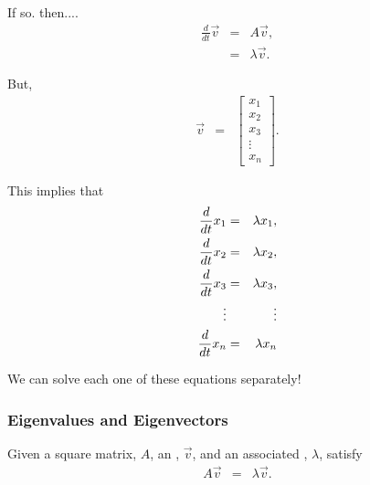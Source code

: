 \begin{frame}
  If so. then....
  \begin{eqnarray*}
    \frac{d}{dt} \vec{v} & = & A \vec{v}, \\
    & = & \lambda \vec{v}.
  \end{eqnarray*}

  {
    But,
    \begin{eqnarray*}
      \vec{v} & = & 
      \left[
        \begin{array}{r}
          x_1 \\ x_2 \\ x_3 \\ \vdots \\ x_n
        \end{array}
      \right].
    \end{eqnarray*}
  }
  
  {
    This implies that
    \begin{eqnarray*}
      \deriv{x_1}{t} & = & \lambda x_1, \\
      \deriv{x_2}{t} & = & \lambda x_2, \\
      \deriv{x_3}{t} & = & \lambda x_3, \\
      \vdots         &   & \vdots \\
      \deriv{x_n}{t} & = & \lambda x_n
    \end{eqnarray*}

    We can solve each one of these equations separately!
  }

\end{frame}


\begin{frame}
  \frametitle{Eigenvalues and Eigenvectors}

  \begin{definition}
    Given a square matrix, $A$, an , $\vec{v}$,
    and an associated , $\lambda$, satisfy
    \begin{eqnarray*}
      A \vec{v} & = & \lambda \vec{v}.
    \end{eqnarray*}
  \end{definition}



\end{frame}


